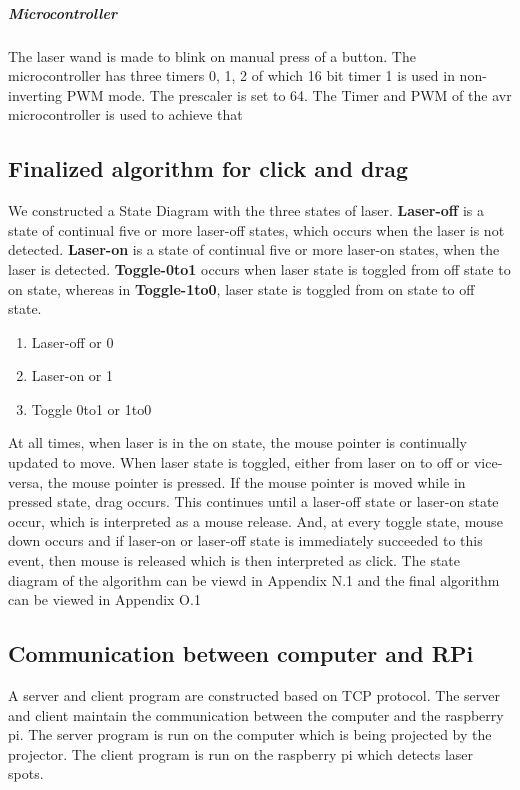 \documentclass[12pt, a4paper]{article}
\begin{document}
\subparagraph{Microcontroller}

The laser wand is made to blink on manual press of a button. The microcontroller has three timers 0, 1, 2 of which 16 bit timer 1 is used in non-inverting PWM mode. The prescaler is set to 64. The Timer and PWM of the avr microcontroller is used to achieve that 

\subsection{Finalized algorithm for click and drag}
	We constructed a State Diagram with the three states of laser. \textbf {Laser-off} is a state of continual five or more laser-off  states, which occurs when the laser is not detected. \textbf{Laser-on} is a state of continual five or more laser-on states, when the laser is detected. \textbf{Toggle-0to1} occurs when laser state is toggled from off state to on state, whereas in \textbf{Toggle-1to0}, laser state is toggled from on state to off state. 
\begin{enumerate}
\item Laser-off or 0
\item Laser-on or 1
\item Toggle 0to1 or 1to0 
\end{enumerate}	

\indent

At all times, when laser is in the on state, the mouse pointer is continually updated to move. When laser state is toggled, either from laser on to off or vice-versa, the mouse pointer is pressed. If the mouse pointer is moved while in pressed state, drag occurs. This continues until a laser-off state or laser-on state occur, which is interpreted as a mouse release. And, at every toggle state, mouse down occurs and if laser-on or laser-off state is immediately succeeded to this event, then mouse is released which is then interpreted as click. The state diagram of the algorithm can be viewd in Appendix N.1 and the final algorithm can be viewed in Appendix O.1
	

\subsection{Communication between computer and RPi}
	A server and client program are constructed based on TCP protocol. The server and client maintain the communication between the computer and the raspberry pi. The server program is run on the computer which is being projected by the projector. The client program is run on the raspberry pi which detects laser spots. 
	
\end{document}
